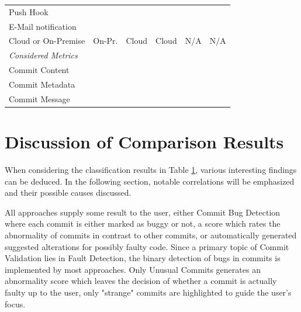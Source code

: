 \begin{table}[p]
\begin{tabular}{@{}lccccc@{}}
		Push Hook & \pointno & \pointyes & \pointno & \pnotapplicable & \pnotapplicable \\
		E-Mail notification & \pnotapplicable & \pointyes & \pointno & \pnotapplicable & \pnotapplicable \\
		Cloud or On-Premise & On-Pr. & Cloud & Cloud & N/A & N/A \\ \midrule
		\textit{Considered Metrics} & & & & & \\
		Commit Content & \pointyes & \pointyes & \pointyes & \pointyes & \pointyes \\
		Commit Metadata & \pointno & \pointno & \pointyes & \pointno & \pointno \\
		Commit Message & \pointyes & \pointyes & \pointno & \pointyes & \pointyes \\ \bottomrule
	\end{tabular}
	\label{tab:classification}
\end{table}

\section{Discussion of Comparison Results}
\label{sec:discussion}


When considering the classification results in Table \ref{tab:classification}, various interesting findings can be deduced. In the following section, notable correlations will be emphasized and their possible causes discussed.

All approaches supply some result to the user, either Commit Bug Detection where each commit is either marked as buggy or not, a score which rates the abnormality of commits in contrast to other commits, or automatically generated suggested alterations for possibly faulty code. Since a primary topic of Commit Validation lies in Fault Detection, the binary detection of bugs in commits is implemented by most approaches. Only Unusual Commits \cite{Goyal2017} generates an abnormality score which leaves the decision of whether a commit is actually faulty up to the user, only "strange" commits are highlighted to guide the user's focus.

